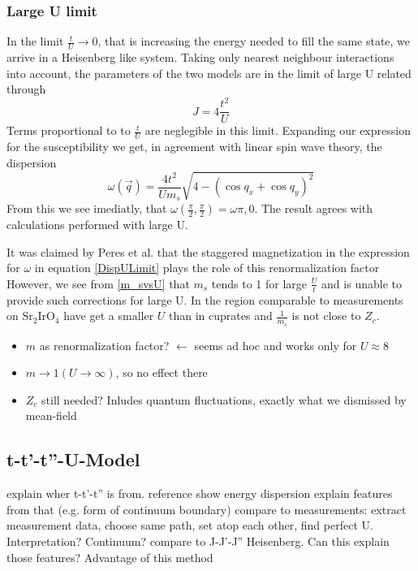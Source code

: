 \documentclass[a4paper,10pt]{report}
\begin{document}
\subsubsection{Large U limit}

In the limit $\frac{t}{U}\rightarrow 0$, that is increasing the energy needed to fill the same state, we arrive in a Heisenberg like system. 
Taking only nearest neighbour interactions into account, the parameters of the two models are in the limit of large U related through
\begin{equation}
 J=4\frac{t^2}{U}
\end{equation}
Terms proportional to to $\frac tU$ are neglegible in this limit. 
Expanding our expression for the susceptibility we get, in agreement with linear spin wave theory,
the dispersion
\begin{equation}
 \omega(\vec q) = \frac{4t^2}{Um_s}\sqrt{4-(\cos q_x+\cos q_y)^2} \label{DispULimit}
\end{equation}
From this we see imediatly, that $\omega(\frac{\pi}2 , \frac{\pi}2) = \omega{\pi,0}$.
The result agrees with calculations performed with large U.


It was claimed by Peres et al. that the staggered magnetization in the expression for $\omega$ in equation \ref{DispULimit} plays the role of this renormalization factor \cite{PhysRevB.65.132404}
However, we see from \ref{m_svsU} that $m_s$ tends to 1 for large $\frac Ut$ and is unable to provide such corrections for large U.
In the region comparable to measurements on $\text{Sr}_2\text{IrO}_4$ have get a smaller $U$ than in cuprates and $\frac{1}{m_s}$ is not close to $Z_c$. 

\begin{itemize}
 \item $m$ as renormalization factor? $\leftarrow$ seems ad hoc and works only for $U\approx 8$
 \item $m\rightarrow 1 (U\rightarrow\infty)$, so no effect there
 \item $Z_c$ still needed? Inludes quantum fluctuations, exactly what we dismissed by mean-field
\end{itemize}




\subsection{t-t'-t''-U-Model}
explain wher t-t'-t'' is from. reference
show energy dispersion
explain features from that (e.g. form of continuum boundary)
compare to measurements: extract measurement data, choose same path, set atop each other, find perfect U. Interpretation? Continuum?
compare to J-J'-J'' Heisenberg. Can this explain those features? Advantage of this method
\end{document}
